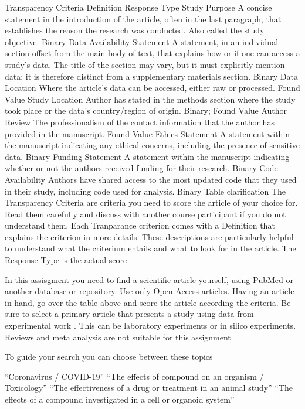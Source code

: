 \documentclass[
]{book}
\begin{document}
Transparency Criteria Definition Response Type
Study Purpose A concise statement in the introduction of the article, often in the last paragraph, that establishes the reason the research was conducted. Also called the study objective. Binary
Data Availability Statement A statement, in an individual section offset from the main body of text, that explains how or if one can access a study's data. The title of the section may vary, but it must explicitly mention data; it is therefore distinct from a supplementary materials section. Binary
Data Location Where the article's data can be accessed, either raw or processed. Found Value
Study Location Author has stated in the methods section where the study took place or the data's country/region of origin. Binary; Found Value
Author Review The professionalism of the contact information that the author has provided in the manuscript. Found Value
Ethics Statement A statement within the manuscript indicating any ethical concerns, including the presence of sensitive data. Binary
Funding Statement A statement within the manuscript indicating whether or not the authors received funding for their research. Binary
Code Availability Authors have shared access to the most updated code that they used in their study, including code used for analysis. Binary
Table clarification The Transparency Criteria are criteria you need to score the article of your choice for. Read them carefully and discuss with another course participant if you do not understand them. Each Tranparance criterion comes with a Definition that explains the criterion in more details. These descriptions are particularly helpful to understand what the criterium entails and what to look for in the article. The Response Type is the actual score

In this assisgment you need to find a scientific article yourself, using PubMed or another database or repository. Use only Open Access articles. Having an article in hand, go over the table above and score the article according the criteria. Be sure to select a primary article that presents a study using data from experimental work . This can be laboratory experiments or in silico experiments. Reviews and meta analysis are not suitable for this assignment

To guide your search you can choose between these topics

``Coronavirus / COVID-19''
``The effects of compound on an organism / Toxicology''
``The effectiveness of a drug or treatment in an animal study''
``The effects of a compound investigated in a cell or organoid system''
\end{document}
